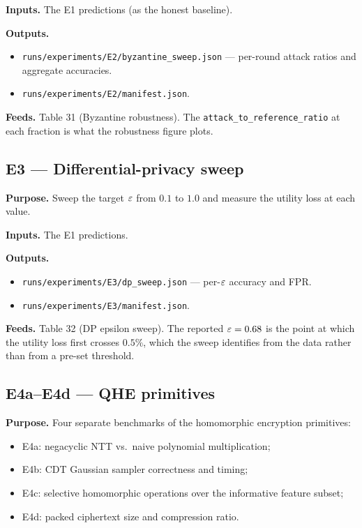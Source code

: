 \textbf{Inputs.} The E1 predictions (as the honest baseline).

\textbf{Outputs.}
\begin{itemize}
\item \texttt{runs/experiments/E2/byzantine\_sweep.json} — per-round
      attack ratios and aggregate accuracies.
\item \texttt{runs/experiments/E2/manifest.json}.
\end{itemize}

\textbf{Feeds.} Table 31 (Byzantine robustness). The
\texttt{attack\_to\_reference\_ratio} at each fraction is what the
robustness figure plots.

\subsection{E3 --- Differential-privacy sweep}

\textbf{Purpose.} Sweep the target $\varepsilon$ from $0.1$ to $1.0$ and
measure the utility loss at each value.

\textbf{Inputs.} The E1 predictions.

\textbf{Outputs.}
\begin{itemize}
\item \texttt{runs/experiments/E3/dp\_sweep.json} — per-$\varepsilon$
      accuracy and FPR.
\item \texttt{runs/experiments/E3/manifest.json}.
\end{itemize}

\textbf{Feeds.} Table 32 (DP epsilon sweep). The reported
$\varepsilon = 0.68$ is the point at which the utility loss first crosses
$0.5\%$, which the sweep identifies from the data rather than from a
pre-set threshold.

\subsection{E4a--E4d --- QHE primitives}

\textbf{Purpose.} Four separate benchmarks of the homomorphic
encryption primitives:

\begin{itemize}
\item E4a: negacyclic NTT vs.\ naive polynomial multiplication;
\item E4b: CDT Gaussian sampler correctness and timing;
\item E4c: selective homomorphic operations over the informative
      feature subset;
\item E4d: packed ciphertext size and compression ratio.
\end{itemize}

